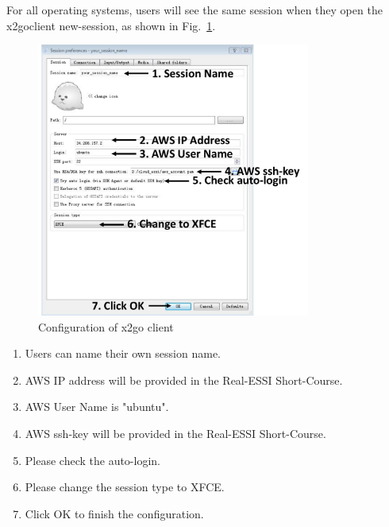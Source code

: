 For all operating systems, users will see the same session when they
open the x2goclient new-session, as shown in Fig.~\ref{fig_x2go_client}.

\begin{figure}[H]
  \centering
  \includegraphics[width = 9cm]{./Figure-files/overview/login_windows_x2go.pdf}
  \caption{Configuration of x2go client}
  \label{fig_x2go_client}
\end{figure}

\begin{enumerate}
	\item Users can name their own session name.
	\item AWS IP address will be provided in the Real-ESSI Short-Course.
	\item AWS User Name is "ubuntu".
	\item AWS ssh-key will be provided in the Real-ESSI Short-Course.
	\item Please check the auto-login.
	\item Please change the session type to XFCE.
	\item Click OK to finish the configuration.
\end{enumerate}



